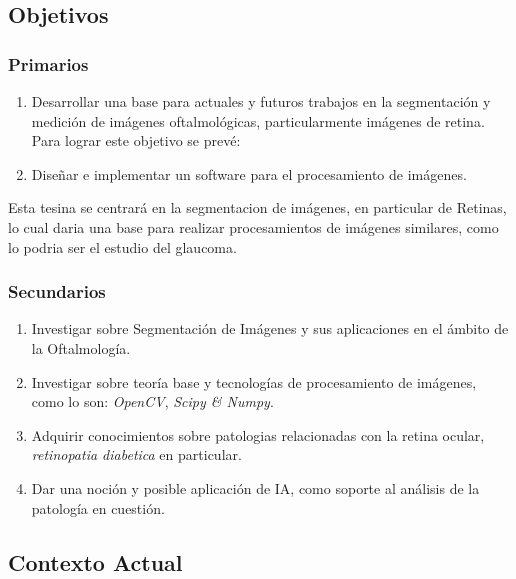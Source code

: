 \documentclass[14pt]{article}
\begin{document}
\subsection{Objetivos}
\subsubsection{Primarios}
\begin{enumerate}
	\item Desarrollar una base para actuales y futuros trabajos en la segmentación y medición de imágenes oftalmológicas, particularmente imágenes de retina.\\[0.3cm]
        Para lograr este objetivo se prevé:
	\item Diseñar e implementar un software para el procesamiento de imágenes.
\end{enumerate}
Esta tesina se centrará en la segmentacion de imágenes, en particular de Retinas, lo cual daria una base para realizar procesamientos de imágenes similares, como lo podria ser el estudio del glaucoma.\\
\subsubsection{Secundarios}
\begin{enumerate}
	\item Investigar sobre Segmentación de Imágenes y sus aplicaciones en el ámbito de la Oftalmología.
	\item Investigar sobre teoría base y tecnologías de procesamiento de imágenes, como lo son: \emph{OpenCV}, \emph{Scipy \& Numpy}.
	\item Adquirir conocimientos sobre patologias relacionadas con la retina ocular, \emph{retinopatia diabetica} en particular. 
	\item Dar una noción y posible aplicación de IA, como soporte al análisis de la patología en cuestión.
\end{enumerate}


\subsection{Contexto Actual}
\end{document}
